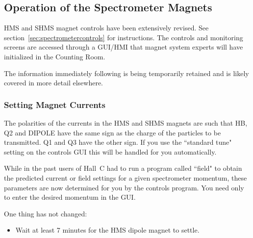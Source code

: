 \subsection{Operation of the Spectrometer Magnets}
\label{ssec:operatemagnets}

HMS and SHMS magnet controls have been extensively revised. See
section~\ref{sec:spectrometercontrols}
for instructions. The controls and
monitoring screens are accessed through a GUI/HMI that magnet system
experts will have initialized in the Counting Room.

The information immediately following is being temporarily retained and is likely
covered in more detail elsewhere.

\subsubsection{Setting Magnet Currents}

The polarities of the currents in the HMS and SHMS magnets are such that
HB, Q2 and DIPOLE have the same sign as the charge of the particles
to be transmitted. Q1 and Q3 have the other sign. If you use the ``standard
tune" setting on the controls GUI this will be handled for you automatically.

While in the past users of Hall~C had to run a program called ``field" to obtain
the predicted current or field settings for a given spectrometer momentum,
these parameters are now determined for you by the controls program. You
need only to enter the desired momentum in the GUI.

One thing has not changed:
\begin{itemize}
\item{Wait at least 7 minutes for the HMS dipole magnet to settle.}
\end{itemize}

